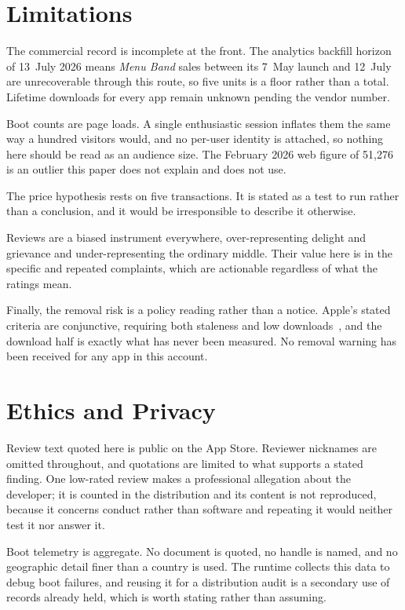 \documentclass[10pt,letterpaper,twocolumn]{article}
\begin{document}
\section{Limitations}
\label{sec:limits}

The commercial record is incomplete at the front. The analytics backfill
horizon of 13~July 2026 means \emph{Menu Band} sales between its 7~May
launch and 12~July are unrecoverable through this route, so five units is
a floor rather than a total. Lifetime downloads for every app remain
unknown pending the vendor number.

Boot counts are page loads. A single enthusiastic session inflates them
the same way a hundred visitors would, and no per-user identity is
attached, so nothing here should be read as an audience size. The
February 2026 web figure of 51,276 is an outlier this paper does not
explain and does not use.

The price hypothesis rests on five transactions. It is stated as a test
to run rather than a conclusion, and it would be irresponsible to
describe it otherwise.

Reviews are a biased instrument everywhere, over-representing delight and
grievance and under-representing the ordinary middle. Their value here is
in the specific and repeated complaints, which are actionable regardless
of what the ratings mean.

Finally, the removal risk is a policy reading rather than a notice.
Apple's stated criteria are conjunctive, requiring both staleness and low
downloads~\citep{apple2022improvements}, and the download half is exactly
what has never been measured. No removal warning has been received for
any app in this account.

\section{Ethics and Privacy}
\label{sec:ethics}

Review text quoted here is public on the App Store. Reviewer nicknames
are omitted throughout, and quotations are limited to what supports a
stated finding. One low-rated review makes a professional allegation
about the developer; it is counted in the distribution and its content
is not reproduced, because it concerns conduct rather than software and
repeating it would neither test it nor answer it.

Boot telemetry is aggregate. No document is quoted, no handle is named,
and no geographic detail finer than a country is used. The runtime
collects this data to debug boot failures, and reusing it for a
distribution audit is a secondary use of records already held, which is
worth stating rather than assuming.
\end{document}
